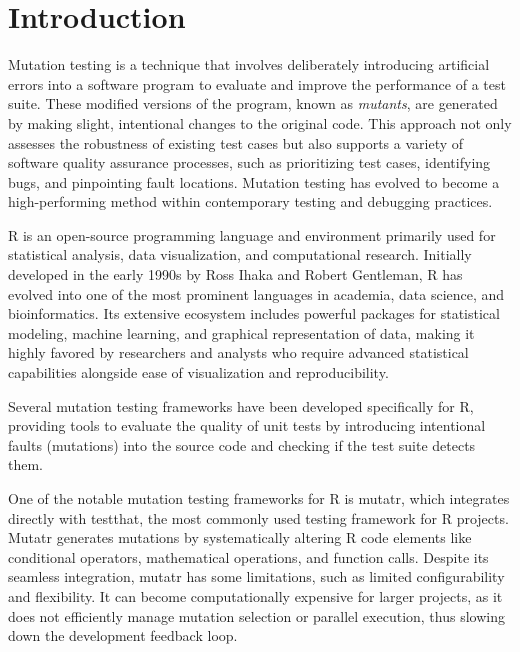 \chapter{Introduction}
\setcounter{page}{1}

\begin{chapterabstract}
\end{chapterabstract}

Mutation testing is a technique that involves deliberately introducing artificial errors into a software program to evaluate and improve the performance of a test suite. These modified versions of the program, known as \textit{mutants}, are generated by making slight, intentional changes to the original code. This approach not only assesses the robustness of existing test cases but also supports a variety of software quality assurance processes, such as prioritizing test cases, identifying bugs, and pinpointing fault locations. Mutation testing has evolved to become a high-performing method within contemporary testing and debugging practices.

R\cite{R-base} is an open-source programming language and environment primarily used for statistical analysis, data visualization, and computational research. Initially developed in the early 1990s by Ross Ihaka and Robert Gentleman, R has evolved into one of the most prominent languages in academia, data science, and bioinformatics. Its extensive ecosystem includes powerful packages for statistical modeling, machine learning, and graphical representation of data, making it highly favored by researchers and analysts who require advanced statistical capabilities alongside ease of visualization and reproducibility.

Several mutation testing frameworks have been developed specifically for R, providing tools to evaluate the quality of unit tests by introducing intentional faults (mutations) into the source code and checking if the test suite detects them.

One of the notable mutation testing frameworks for R is mutatr, which integrates directly with testthat\cite{wickham2011testthat}, the most commonly used testing framework for R projects. Mutatr\cite{wickham_mutatr}
 generates mutations by systematically altering R code elements like conditional operators, mathematical operations, and function calls. Despite its seamless integration, mutatr has some limitations, such as limited configurability and flexibility. It can become computationally expensive for larger projects, as it does not efficiently manage mutation selection or parallel execution, thus slowing down the development feedback loop.

